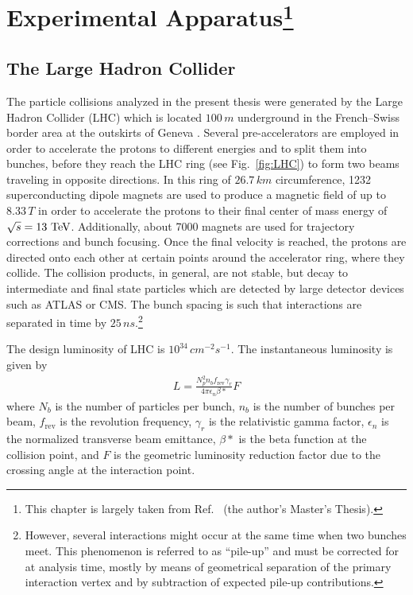 \chapter[Experimental Apparatus]{Experimental Apparatus\protect\footnote{This chapter is largely taken from Ref.~\cite{Thomassen2012} (the author's Master's Thesis).}}
\label{chap:Detector}

\section{The Large Hadron Collider}
The particle collisions analyzed in the present thesis were generated by the Large Hadron Collider (LHC) which is located $100\,\unit{m}$ underground in the French--Swiss border area at the outskirts of Geneva \cite{1748-0221-3-08-S08001}. Several pre-accelerators are employed in order to accelerate the protons to different energies and to split them into bunches, before they reach the LHC ring (see Fig.~\ref{fig:LHC}) to form two beams traveling in opposite directions. In this ring of $26.7\,\unit{km}$ circumference, 1232 superconducting dipole magnets are used to produce a magnetic field of up to $8.33\,\unit{T}$ in order to accelerate the protons to their final center of mass energy of $\sqrt{s} = 13\,\,\text{Te\hspace{-.08em}V}$.
Additionally, about 7000 magnets are used for trajectory corrections and bunch focusing. Once the final velocity is reached, the protons are directed onto each other at certain points around the accelerator ring, where they collide. The collision products, in general, are not stable, but decay to intermediate and final state particles which are detected by large detector devices such as ATLAS or CMS. The bunch spacing is such that interactions are separated in time by $25\,\unit{ns}$.\footnote{However, several interactions might occur at the same time when two bunches meet. This phenomenon is referred to as ``pile-up'' and must be corrected for at analysis time, mostly by means of geometrical separation of the primary interaction vertex and by subtraction of expected pile-up contributions.}

The design luminosity of LHC is $10^{34}\,\unit{cm^{-2}s^{-1}}$. The instantaneous luminosity is given by
\begin{eqnarray}
	L = \frac{N_p^2 n_b f_\text{rev} \gamma_r}{4\pi \epsilon_n \beta*} F
\end{eqnarray}
where $N_b$ is the number of particles per bunch, $n_b$ is the number of bunches per beam, $f_\text{rev}$ is the revolution frequency, $\gamma_r$ is the relativistic gamma factor, $\epsilon_n$ is the normalized transverse beam emittance, $\beta*$ is the beta function at the collision point, and $F$ is the geometric luminosity reduction factor due to the crossing angle at the interaction point.


